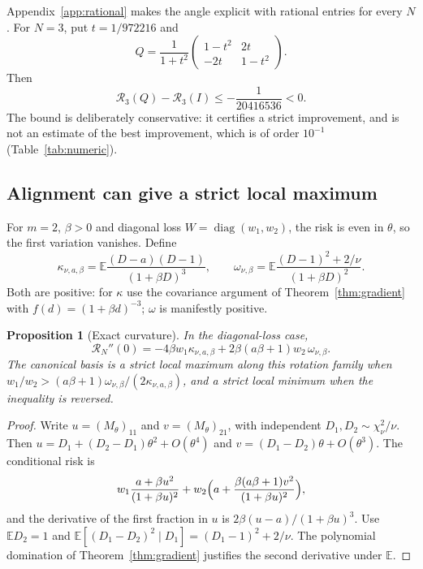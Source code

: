 \documentclass[11pt,a4paper]{article}
\numberwithin{equation}{section}
\newtheorem{proposition}[theorem]{Proposition}
\theoremstyle{remark}\newtheorem{remark}[theorem]{Remark}
\newcommand{\E}{\mathbb E}
\newcommand{\diag}{\operatorname{diag}}
\newcommand{\risk}{\mathcal R}
\begin{document}
Appendix~\ref{app:rational} makes the angle explicit with rational entries for every \(N\).
For \(N=3\), put \(t=1/972216\) and
\[
 Q=\frac1{1+t^2}\begin{pmatrix}1-t^2&2t\\-2t&1-t^2\end{pmatrix}.
\]
Then
\begin{equation}\label{eq:exactgap}
 \risk_3(Q)-\risk_3(I)\le-\frac1{20416536}<0 .
\end{equation}
The bound is deliberately conservative: it certifies a strict improvement, and is not an
estimate of the best improvement, which is of order \(10^{-1}\) (Table~\ref{tab:numeric}).

\subsection{Alignment can give a strict local maximum}\label{sec:aligned}

For \(m=2\), \(\beta>0\) and diagonal loss \(W=\diag(w_1,w_2)\), the risk is even in \(\theta\), so
the first variation vanishes. Define
\[
 \kappa_{\nu,a,\beta}=\E\frac{(D-a)(D-1)}{(1+\beta D)^3},\qquad
 \omega_{\nu,\beta}=\E\frac{(D-1)^2+2/\nu}{(1+\beta D)^2}.
\]
Both are positive: for \(\kappa\) use the covariance argument of Theorem~\ref{thm:gradient}
with \(f(d)=(1+\beta d)^{-3}\); \(\omega\) is manifestly positive.

\begin{proposition}[Exact curvature]\label{prop:curvature}
In the diagonal-loss case,
\begin{equation}\label{eq:curvature}
 \risk_N''(0)=-4\beta w_1\kappa_{\nu,a,\beta}+2\beta(a\beta+1)w_2\,\omega_{\nu,\beta}.
\end{equation}
The canonical basis is a strict local maximum along this rotation family when
\(w_1/w_2>(a\beta+1)\omega_{\nu,\beta}/(2\kappa_{\nu,a,\beta})\), and a strict local minimum when
the inequality is reversed.
\end{proposition}
\begin{proof}
Write \(u=(M_\theta)_{11}\) and \(v=(M_\theta)_{21}\), with independent
\(D_1,D_2\sim\chi_\nu^2/\nu\). Then \(u=D_1+(D_2-D_1)\theta^2+O(\theta^4)\) and
\(v=(D_1-D_2)\theta+O(\theta^3)\). The conditional risk is
\[
 w_1\frac{a+\beta u^2}{(1+\beta u)^2}
 +w_2\Bigl(a+\frac{\beta(a\beta+1)v^2}{(1+\beta u)^2}\Bigr),
\]
and the derivative of the first fraction in \(u\) is \(2\beta(u-a)/(1+\beta u)^3\). Use
\(\E D_2=1\) and \(\E[(D_1-D_2)^2\mid D_1]=(D_1-1)^2+2/\nu\). The polynomial domination of
Theorem~\ref{thm:gradient} justifies the second derivative under \(\E\).
\end{proof}
\end{document}
